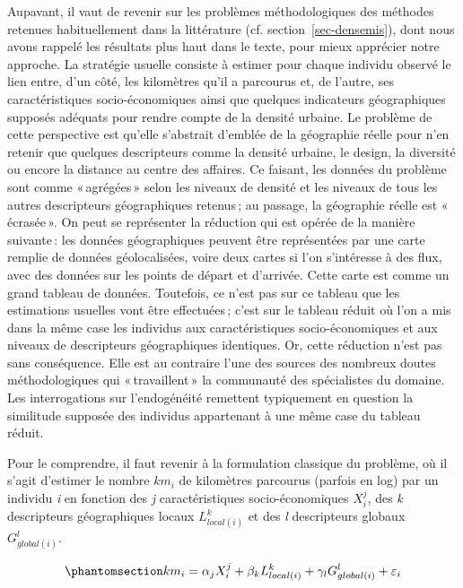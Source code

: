 \documentclass[
  9pt,
  a4paper,
  DIV=11]{scrreprt}
\begin{document}
Aupavant, il vaut de revenir sur les problèmes méthodologiques des
méthodes retenues habituellement dans la littérature (cf.
section~\ref{sec-densemis}), dont nous avons rappelé les résultats plus
haut dans le texte, pour mieux apprécier notre approche. La stratégie
usuelle consiste à estimer pour chaque individu observé le lien entre,
d'un côté, les kilomètres qu'il a parcourus et, de l'autre, ses
caractéristiques socio-économiques ainsi que quelques indicateurs
géographiques supposés adéquats pour rendre compte de la densité
urbaine. Le problème de cette perspective est qu'elle s'abstrait
d'emblée de la géographie réelle pour n'en retenir que quelques
descripteurs comme la densité urbaine, le design, la diversité ou encore
la distance au centre des affaires. Ce faisant, les données du problème
sont comme «\,agrégées\,» selon les niveaux de densité et les niveaux de
tous les autres descripteurs géographiques retenus\,; au passage, la
géographie réelle est «\,écrasée\,». On peut se représenter la réduction
qui est opérée de la manière suivante\,: les données géographiques
peuvent être représentées par une carte remplie de données
géolocalisées, voire deux cartes si l'on s'intéresse à des flux, avec
des données sur les points de départ et d'arrivée. Cette carte est comme
un grand tableau de données. Toutefois, ce n'est pas sur ce tableau que
les estimations usuelles vont être effectuées\,; c'est sur le tableau
réduit où l'on a mis dans la même case les individus aux
caractéristiques socio-économiques et aux niveaux de descripteurs
géographiques identiques. Or, cette réduction n'est pas sans
conséquence. Elle est au contraire l'une des sources des nombreux doutes
méthodologiques qui «\,travaillent\,» la communauté des spécialistes du
domaine. Les interrogations sur l'endogénéité remettent typiquement en
question la similitude supposée des individus appartenant à une même
case du tableau réduit.

Pour le comprendre, il faut revenir à la formulation classique du
problème, où il s'agit d'estimer le nombre \(km_i\) de kilomètres
parcourus (parfois en log) par un individu \emph{i} en fonction des
\emph{j} caractéristiques socio-économiques \(X_i^j\), des \emph{k}
descripteurs géographiques locaux \(L_{local(i)}^k\) et des \emph{l}
descripteurs globaux \(G_{global(i)}^l\).

\begin{equation}\phantomsection\label{eq-orthodoxe}{ km_i = \alpha_j X_i^j + \beta_k L^k_{local(i)} + \gamma_l G^l_{global(i)} + \varepsilon_i }\end{equation}
\end{document}
